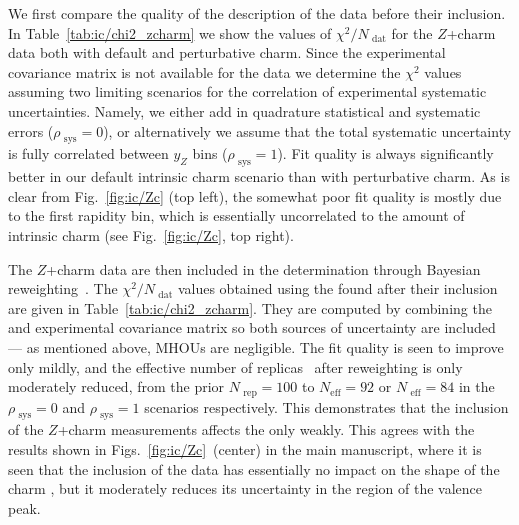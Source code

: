 We first compare the quality of the description of the \lhcb data
before their inclusion. In Table~\ref{tab:ic/chi2_zcharm} we show the
values of $\chi^2/N_\textrm{ dat}$ for the \lhcb $Z$+charm data
both with default and perturbative charm.
%
Since the experimental covariance matrix is not available for the \lhcb
data we determine the $\chi^2$ values assuming two limiting scenarios
for the correlation of experimental systematic uncertainties.
%
Namely, 
we either add in quadrature statistical and systematic errors ($\rho_\textrm{ sys}=0$),
or alternatively we assume that the total systematic uncertainty
is fully correlated between $y_Z$ bins ($\rho_\textrm{ sys}=1$). Fit
quality is always significantly better in our default intrinsic charm
scenario than with perturbative charm.
%
As is clear from
Fig.~\ref{fig:ic/Zc} (top left), the somewhat poor fit quality is mostly due to the first
rapidity bin, which is essentially uncorrelated to the amount of
intrinsic charm (see
Fig.~\ref{fig:ic/Zc}, top right).

The \lhcb $Z$+charm data are then included in the \pdf determination
through
Bayesian reweighting~\cite{Ball:2010gb,Ball:2011gg}. The
$\chi^2/N_\textrm{ dat}$ values obtained using the \pdfs found after their
inclusion are given in
Table~\ref{tab:ic/chi2_zcharm}.
%
They are computed by combining the \pdf and
experimental covariance matrix so both sources of uncertainty are
included --- as mentioned above, MHOUs are negligible.
The fit quality is seen to improve only
mildly, and the effective number of
replicas~\cite{Ball:2010gb,Ball:2011gg} after reweighting
is only moderately reduced, from the prior $N_\textrm{ rep}=100$ to $N_\textrm{
eff}=92$ or $N_\textrm{ eff}=84$ in the
$\rho_\textrm{ sys}=0$ and $\rho_\textrm{ sys}=1$ scenarios respectively.
%
This
demonstrates that the inclusion of the \lhcb $Z$+charm measurements  affects
the \pdfs only weakly. This agrees with the results shown in 
Figs.~\ref{fig:ic/Zc}~(center) in
the main manuscript, where it is seen that the inclusion of the \lhcb
data has essentially no impact on the shape of the charm \pdf, but
it moderately reduces its uncertainty in the region of the valence peak.
